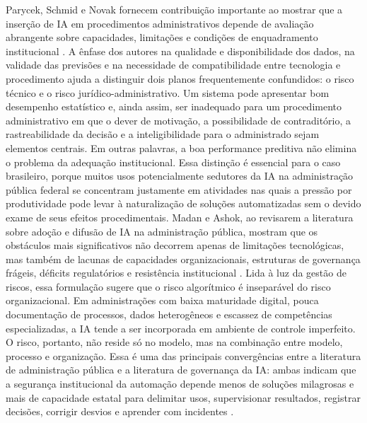 \documentclass[12pt,a4paper]{article}
\begin{document}
Parycek, Schmid e Novak fornecem contribuição importante ao mostrar que a inserção de IA em procedimentos administrativos depende de avaliação abrangente sobre capacidades, limitações e condições de enquadramento institucional \autocite{parycek2023artificial}. A ênfase dos autores na qualidade e disponibilidade dos dados, na validade das previsões e na necessidade de compatibilidade entre tecnologia e procedimento ajuda a distinguir dois planos frequentemente confundidos: o risco técnico e o risco jurídico-administrativo. Um sistema pode apresentar bom desempenho estatístico e, ainda assim, ser inadequado para um procedimento administrativo em que o dever de motivação, a possibilidade de contraditório, a rastreabilidade da decisão e a inteligibilidade para o administrado sejam elementos centrais. Em outras palavras, a boa performance preditiva não elimina o problema da adequação institucional. Essa distinção é essencial para o caso brasileiro, porque muitos usos potencialmente sedutores da IA na administração pública federal se concentram justamente em atividades nas quais a pressão por produtividade pode levar à naturalização de soluções automatizadas sem o devido exame de seus efeitos procedimentais.
Madan e Ashok, ao revisarem a literatura sobre adoção e difusão de IA na administração pública, mostram que os obstáculos mais significativos não decorrem apenas de limitações tecnológicas, mas também de lacunas de capacidades organizacionais, estruturas de governança frágeis, déficits regulatórios e resistência institucional \autocite{madan2022ai}. Lida à luz da gestão de riscos, essa formulação sugere que o risco algorítmico é inseparável do risco organizacional. Em administrações com baixa maturidade digital, pouca documentação de processos, dados heterogêneos e escassez de competências especializadas, a IA tende a ser incorporada em ambiente de controle imperfeito. O risco, portanto, não reside só no modelo, mas na combinação entre modelo, processo e organização. Essa é uma das principais convergências entre a literatura de administração pública e a literatura de governança da IA: ambas indicam que a segurança institucional da automação depende menos de soluções milagrosas e mais de capacidade estatal para delimitar usos, supervisionar resultados, registrar decisões, corrigir desvios e aprender com incidentes \autocite{criado2024artificial} \autocite{sigfrids2022how}.
\end{document}
